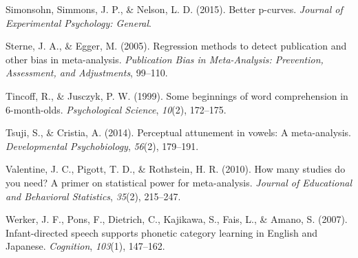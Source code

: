 \documentclass[english,floatsintext,man]{apa6}
\begin{document}
\hypertarget{ref-simonsohn2015better}{}
Simonsohn, Simmons, J. P., \& Nelson, L. D. (2015). Better p-curves.
\emph{Journal of Experimental Psychology: General}.

\hypertarget{ref-sterne2005regression}{}
Sterne, J. A., \& Egger, M. (2005). Regression methods to detect
publication and other bias in meta-analysis. \emph{Publication Bias in
Meta-Analysis: Prevention, Assessment, and Adjustments}, 99--110.

\hypertarget{ref-tincoff1999some}{}
Tincoff, R., \& Jusczyk, P. W. (1999). Some beginnings of word
comprehension in 6-month-olds. \emph{Psychological Science},
\emph{10}(2), 172--175.

\hypertarget{ref-tsuji2014perceptual}{}
Tsuji, S., \& Cristia, A. (2014). Perceptual attunement in vowels: A
meta-analysis. \emph{Developmental Psychobiology}, \emph{56}(2),
179--191.

\hypertarget{ref-valentine2010many}{}
Valentine, J. C., Pigott, T. D., \& Rothstein, H. R. (2010). How many
studies do you need? A primer on statistical power for meta-analysis.
\emph{Journal of Educational and Behavioral Statistics}, \emph{35}(2),
215--247.

\hypertarget{ref-werker2007infant}{}
Werker, J. F., Pons, F., Dietrich, C., Kajikawa, S., Fais, L., \& Amano,
S. (2007). Infant-directed speech supports phonetic category learning in
English and Japanese. \emph{Cognition}, \emph{103}(1), 147--162.
\end{document}
